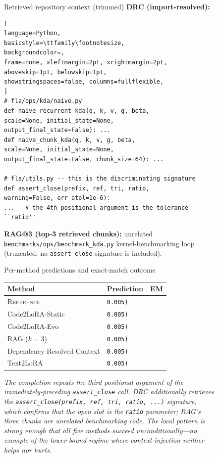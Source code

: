 \documentclass{llmxive}
\providecommand{\codelora}{Code2LoRA\xspace}
\providecommand{\codelorastatic}{\codelora-Static\xspace}
\providecommand{\codeloraevo}{\codelora-Evo\xspace}
\providecommand{\textlora}{Text2LoRA\xspace}
\begin{document}
\begin{figure}[!htbp]
\begin{center}
\begin{tcolorbox}
\begin{qexsection}{Retrieved repository context (trimmed)}
\textbf{\footnotesize DRC (import-resolved):}
\begin{lstlisting}[
language=Python,
basicstyle=\ttfamily\footnotesize,
backgroundcolor=,
frame=none, xleftmargin=2pt, xrightmargin=2pt,
aboveskip=1pt, belowskip=1pt,
showstringspaces=false, columns=fullflexible,
]
# fla/ops/kda/naive.py
def naive_recurrent_kda(q, k, v, g, beta,
scale=None, initial_state=None,
output_final_state=False): ...
def naive_chunk_kda(q, k, v, g, beta,
scale=None, initial_state=None,
output_final_state=False, chunk_size=64): ...

# fla/utils.py -- this is the discriminating signature
def assert_close(prefix, ref, tri, ratio,
warning=False, err_atol=1e-6):
...   # the 4th positional argument is the tolerance ``ratio''
\end{lstlisting}
\textbf{\footnotesize RAG@3 (top-3 retrieved chunks):} unrelated \texttt{benchmarks/ops/benchmark\_kda.py} kernel-benchmarking loop (truncated; no \texttt{assert\_close} signature is included).
\end{qexsection}

\begin{qexsection}{Per-method predictions and exact-match outcome}
\footnotesize
\setlength{\tabcolsep}{6pt}
\begin{tabular}{@{}llc@{}}
\toprule
Method & Prediction & EM \\
\midrule
\textsc{Reference}                            & \texttt{0.005)}  & \\
\midrule
\codelorastatic{}                             & \texttt{0.005)}  &  \\
\codeloraevo{}                                & \texttt{0.005)}  &  \\
RAG ($k\!=\!3$)                               & \texttt{0.005)}  &  \\
Dependency-Resolved Context                   & \texttt{0.005)}  &  \\
\textlora{}                                   & \texttt{0.005)}  &  \\
\bottomrule
\end{tabular}
\end{qexsection}

\vspace{1pt}
{\footnotesize\itshape
The completion repeats the third positional argument of the immediately-preceding \texttt{assert\_close} call. DRC additionally retrieves the \texttt{assert\_close(prefix, ref, tri, ratio, ...)} signature, which confirms that the open slot is the \texttt{ratio} parameter; RAG's three chunks are unrelated benchmarking code. The local pattern is strong enough that all five methods succeed unconditionally---an example of the lower-bound regime where context injection neither helps nor hurts.
}


\end{tcolorbox}
\end{center}
\end{figure}
\end{document}
